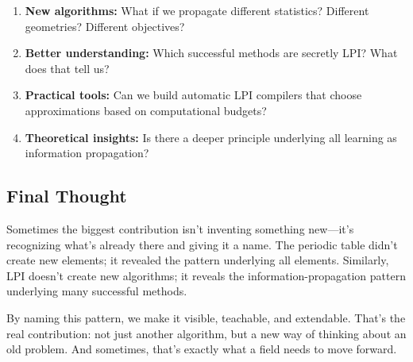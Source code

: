 \documentclass[11pt]{article}
\begin{document}
\begin{enumerate}
\item \textbf{New algorithms:} What if we propagate different statistics? Different geometries? Different objectives?
\item \textbf{Better understanding:} Which successful methods are secretly LPI? What does that tell us?
\item \textbf{Practical tools:} Can we build automatic LPI compilers that choose approximations based on computational budgets?
\item \textbf{Theoretical insights:} Is there a deeper principle underlying all learning as information propagation?
\end{enumerate}

\subsection{Final Thought}

Sometimes the biggest contribution isn't inventing something new—it's recognizing what's already there and giving it a name. The periodic table didn't create new elements; it revealed the pattern underlying all elements. Similarly, LPI doesn't create new algorithms; it reveals the information-propagation pattern underlying many successful methods.

By naming this pattern, we make it visible, teachable, and extendable. That's the real contribution: not just another algorithm, but a new way of thinking about an old problem. And sometimes, that's exactly what a field needs to move forward.


\end{document}
